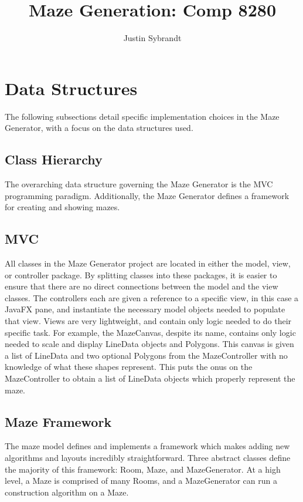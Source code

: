 \documentclass[12pt,letterpaper]{article}
\author{Justin Sybrandt}
\title{Maze Generation: Comp 8280}
\begin{document}
	
	\maketitle
	
	\section{Data Structures}
	
	The following subsections detail specific implementation choices in the Maze Generator, with a focus on the data structures used.
	
	\subsection{Class Hierarchy}
	
	The overarching data structure governing the Maze Generator is the MVC programming paradigm. Additionally, the Maze Generator defines a framework for creating and showing mazes. 
	
	\subsection{MVC}
	
	All classes in the Maze Generator project are located in either the model, view, or controller package. By splitting classes into these packages, it is easier to ensure that there are no direct connections between the model and the view classes. The controllers each are given a reference to a specific view, in this case a JavaFX pane, and instantiate the necessary model objects needed to populate that view. Views are very lightweight, and contain only logic needed to do their specific task. For example, the MazeCanvas, despite its name, contains only logic needed to scale and display LineData objects and Polygons. This canvas is given a list of LineData and two optional Polygons from the MazeController with no knowledge of what these shapes represent. This puts the onus on the MazeController to obtain a list of LineData objects which properly represent the maze.
	
	\subsection{Maze Framework}
	
	The maze model defines and implements a framework which makes adding new algorithms and layouts incredibly straightforward. Three abstract classes define the majority of this framework: Room, Maze, and MazeGenerator. At a high level, a Maze is comprised of many Rooms, and a MazeGenerator can run a construction algorithm on a Maze.
	
\end{document}
